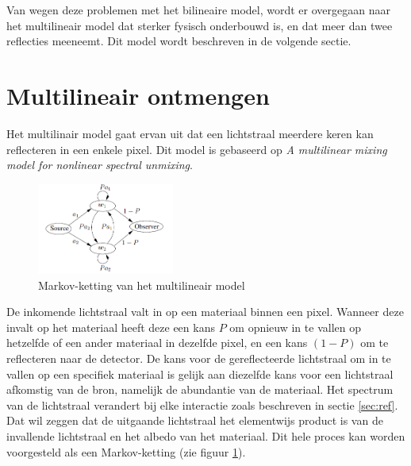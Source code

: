 \documentclass[12pt]{report}
\begin{document}
Van wegen deze problemen met het bilineaire model, wordt er overgegaan naar het multilineair model dat sterker fysisch onderbouwd is, en dat meer dan twee reflecties meeneemt. Dit model wordt beschreven in de volgende sectie.

\section{Multilineair ontmengen} \label{sec:multi}

Het multilinair model gaat ervan uit dat een lichtstraal meerdere keren kan reflecteren in een enkele pixel. Dit model is gebaseerd op \textit{A multilinear mixing model for nonlinear spectral unmixing}\cite{mlinmix}. 

\begin{figure}
\includegraphics[width=0.4\textwidth]{multi.PNG}
\caption{Markov-ketting van het multilineair model \label{fig:multi}}
\end{figure}

De inkomende lichtstraal valt in op een materiaal binnen een pixel. Wanneer deze invalt op het materiaal heeft deze een kans $P$ om opnieuw in te vallen op hetzelfde of een ander materiaal in dezelfde pixel, en een kans $(1 - P)$ om te reflecteren naar de detector. De kans voor de gereflecteerde lichtstraal om in te vallen op een specifiek materiaal is gelijk aan diezelfde kans voor een lichtstraal afkomstig van de bron, namelijk de abundantie van de materiaal. Het spectrum van de lichtstraal verandert bij elke interactie zoals beschreven in sectie \ref{sec:ref}. Dat wil zeggen dat de uitgaande lichtstraal het elementwijs product is van de invallende lichtstraal en het albedo van het materiaal.
Dit hele proces kan worden voorgesteld als een Markov-ketting (zie figuur \ref{fig:multi}).

\end{document}
